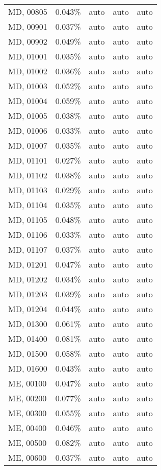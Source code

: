 \begin{longtable}[]{@{}lllll@{}}
MD, 00805 & 0.043\% & auto & auto & auto \\
MD, 00901 & 0.037\% & auto & auto & auto \\
MD, 00902 & 0.049\% & auto & auto & auto \\
MD, 01001 & 0.035\% & auto & auto & auto \\
MD, 01002 & 0.036\% & auto & auto & auto \\
MD, 01003 & 0.052\% & auto & auto & auto \\
MD, 01004 & 0.059\% & auto & auto & auto \\
MD, 01005 & 0.038\% & auto & auto & auto \\
MD, 01006 & 0.033\% & auto & auto & auto \\
MD, 01007 & 0.035\% & auto & auto & auto \\
MD, 01101 & 0.027\% & auto & auto & auto \\
MD, 01102 & 0.038\% & auto & auto & auto \\
MD, 01103 & 0.029\% & auto & auto & auto \\
MD, 01104 & 0.035\% & auto & auto & auto \\
MD, 01105 & 0.048\% & auto & auto & auto \\
MD, 01106 & 0.033\% & auto & auto & auto \\
MD, 01107 & 0.037\% & auto & auto & auto \\
MD, 01201 & 0.047\% & auto & auto & auto \\
MD, 01202 & 0.034\% & auto & auto & auto \\
MD, 01203 & 0.039\% & auto & auto & auto \\
MD, 01204 & 0.044\% & auto & auto & auto \\
MD, 01300 & 0.061\% & auto & auto & auto \\
MD, 01400 & 0.081\% & auto & auto & auto \\
MD, 01500 & 0.058\% & auto & auto & auto \\
MD, 01600 & 0.043\% & auto & auto & auto \\
ME, 00100 & 0.047\% & auto & auto & auto \\
ME, 00200 & 0.077\% & auto & auto & auto \\
ME, 00300 & 0.055\% & auto & auto & auto \\
ME, 00400 & 0.046\% & auto & auto & auto \\
ME, 00500 & 0.082\% & auto & auto & auto \\
ME, 00600 & 0.037\% & auto & auto & auto \\

\end{longtable}
